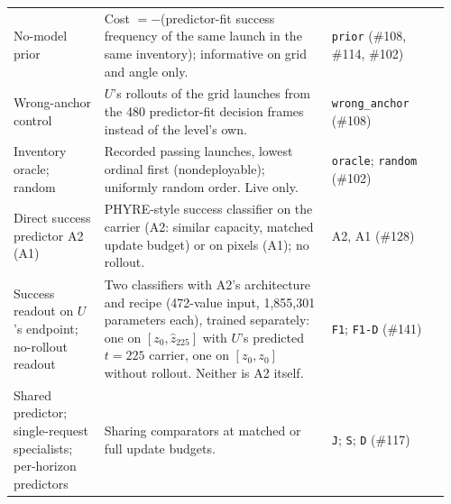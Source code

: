 \begin{longtable}{@{}>{\raggedright\arraybackslash}p{0.2\linewidth}>{\raggedright\arraybackslash}p{0.5\linewidth}>{\raggedright\arraybackslash}p{0.26\linewidth}@{}}
No-model prior & Cost $=-$(predictor-fit success frequency of the same launch in the same inventory); informative on grid and angle only. & \texttt{prior} (\#108, \#114, \#102) \\
Wrong-anchor control & $U$'s rollouts of the grid launches from the 480 predictor-fit decision frames instead of the level's own. & \texttt{wrong\_anchor} (\#108) \\
Inventory oracle; random & Recorded passing launches, lowest ordinal first (nondeployable); uniformly random order. Live only. & \texttt{oracle}; \texttt{random} (\#102) \\
Direct success predictor A2 (A1) & PHYRE-style success classifier on the carrier (A2: similar capacity, matched update budget) or on pixels (A1); no rollout. & A2, A1 (\#128) \\
Success readout on $U$'s endpoint; no-rollout readout & Two classifiers with A2's architecture and recipe (472-value input, 1,855,301 parameters each), trained separately: one on $[z_0,\hat z_{225}]$ with $U$'s predicted $t=225$ carrier, one on $[z_0,z_0]$ without rollout. Neither is A2 itself. & \texttt{F1}; \texttt{F1-D} (\#141) \\
Shared predictor; single-request specialists; per-horizon predictors & Sharing comparators at matched or full update budgets. & \texttt{J}; \texttt{S}; \texttt{D} (\#117) \\
\end{longtable}
\endgroup
